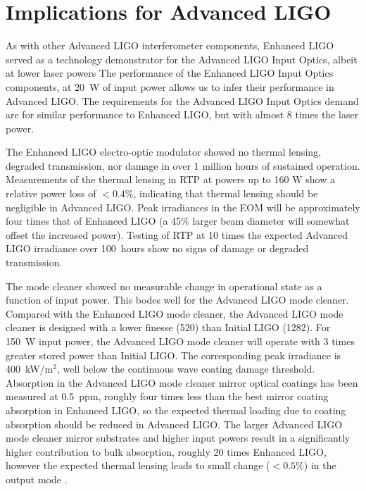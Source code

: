 \section{Implications for Advanced LIGO}
\label{sec:aLIGO}
As with other Advanced LIGO interferometer components, Enhanced LIGO
served as a technology demonstrator for the Advanced LIGO Input
Optics, albeit at lower laser powers The performance of the Enhanced
LIGO Input Optics components, at 20~W of input power allows us to
infer their performance in Advanced LIGO.  The requirements for the
Advanced LIGO Input Optics demand are for similar performance to
Enhanced LIGO, but with almost 8 times the laser power.

The Enhanced LIGO electro-optic modulator showed no thermal lensing,
degraded transmission, nor damage in over 1 million hours of sustained
operation. Measurements of the thermal lensing in RTP at powers up to
160 W show a relative power loss of $< 0.4\%$, indicating that thermal
lensing should be negligible in Advanced LIGO.  Peak irradiances in
the EOM will be approximately four times that of Enhanced LIGO (a 45\%
larger beam diameter will somewhat offset the increased power).
Testing of RTP at 10 times the expected Advanced LIGO irradiance over
100~hours show no signs of damage or degraded transmission.

The mode cleaner showed no measurable change in operational state as a
function of input power.  This bodes well for the Advanced LIGO mode
cleaner.  Compared with the Enhanced LIGO mode cleaner, the Advanced
LIGO mode cleaner is designed with a lower finesse (520) than Initial
LIGO (1282).  For 150~W input power, the Advanced LIGO mode cleaner
will operate with 3 times greater stored power than Initial LIGO.  The
corresponding peak irradiance is 400~kW/m$^2$, well below the
continuous wave coating damage threshold.  Absorption in the Advanced
LIGO mode cleaner mirror optical coatings has been measured at
0.5~ppm, roughly four times less than the best mirror coating
absorption in Enhanced LIGO, so the expected thermal loading due to
coating absorption should be reduced in Advanced LIGO.  The larger
Advanced LIGO mode cleaner mirror substrates and higher input powers
result in a significantly higher contribution to bulk absorption,
roughly 20 times Enhanced LIGO, however the expected thermal lensing
leads to small change ($< 0.5 \%$) in the output mode
\citep{Arain2007Note}.

